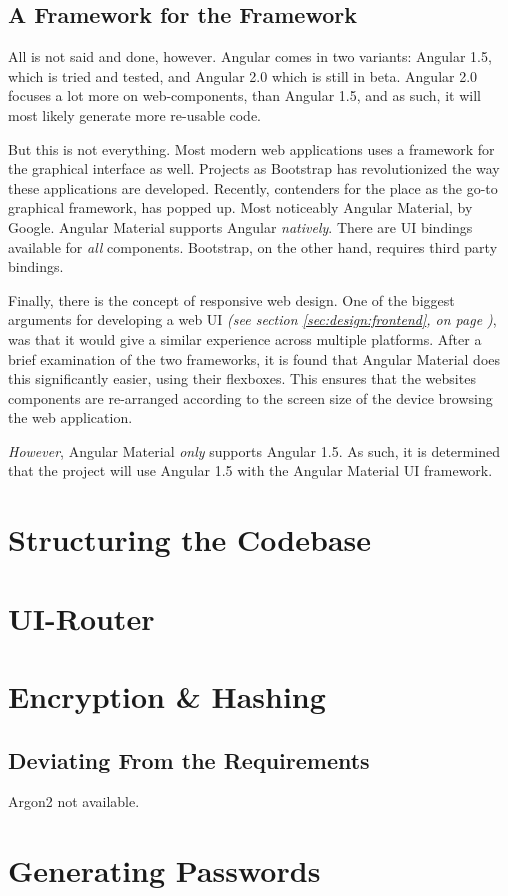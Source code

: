 		\subsection{A Framework for the Framework}
			All is not said and done, however. Angular comes in two variants: Angular 1.5, which is tried and tested, and Angular 2.0 which is still in beta. Angular 2.0 focuses a lot more on web-components, than Angular 1.5, and as such, it will most likely generate more re-usable code. 

			But this is not everything. Most modern web applications uses a framework for the graphical interface as well. Projects as Bootstrap has revolutionized the way these applications are developed. Recently, contenders for the place as the go-to graphical framework, has popped up. Most noticeably Angular Material, by Google. Angular Material supports Angular \emph{natively}. There are UI bindings available for \emph{all} components. Bootstrap, on the other hand, requires third party bindings. 

			Finally, there is the concept of responsive web design. One of the biggest arguments for developing a web UI \emph{(see section \ref{sec:design:frontend}, on page \pageref{sec:design:frontend})}, was that it would give a similar experience across multiple platforms. After a brief examination of the two frameworks, it is found that Angular Material does this significantly easier, using their flexboxes. This ensures that the websites components are re-arranged according to the screen size of the device browsing the web application.

			\emph{However}, Angular Material \emph{only} supports Angular 1.5. As such, it is determined that the project will use Angular 1.5 with the Angular Material UI framework.


	\section{Structuring the Codebase}
		


	\section{UI-Router}
		\label{sec:impl:ui-router}

	\section{Encryption \& Hashing}

		\subsection{Deviating From the Requirements}
			Argon2 not available.

	\section{Generating Passwords}
